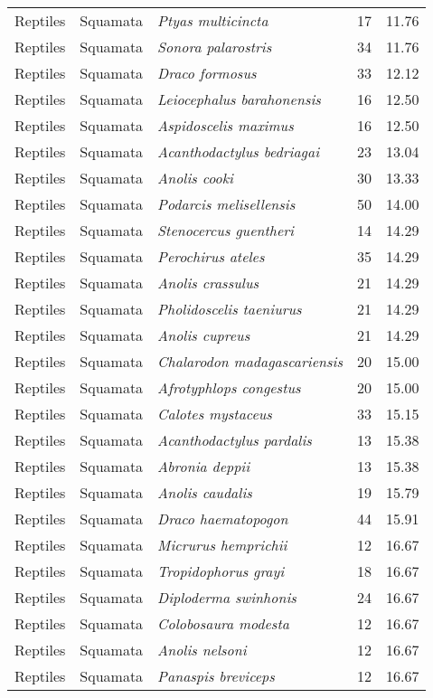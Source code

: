 \begin{longtable}{ll>{\itshape}lcc}
  Reptiles & Squamata & Ptyas multicincta &  17 & 11.76 \\ 
  Reptiles & Squamata & Sonora palarostris &  34 & 11.76 \\ 
  Reptiles & Squamata & Draco formosus &  33 & 12.12 \\ 
  Reptiles & Squamata & Leiocephalus barahonensis &  16 & 12.50 \\ 
  Reptiles & Squamata & Aspidoscelis maximus &  16 & 12.50 \\ 
  Reptiles & Squamata & Acanthodactylus bedriagai &  23 & 13.04 \\ 
  Reptiles & Squamata & Anolis cooki &  30 & 13.33 \\ 
  Reptiles & Squamata & Podarcis melisellensis &  50 & 14.00 \\ 
  Reptiles & Squamata & Stenocercus guentheri &  14 & 14.29 \\ 
  Reptiles & Squamata & Perochirus ateles &  35 & 14.29 \\ 
  Reptiles & Squamata & Anolis crassulus &  21 & 14.29 \\ 
  Reptiles & Squamata & Pholidoscelis taeniurus &  21 & 14.29 \\ 
  Reptiles & Squamata & Anolis cupreus &  21 & 14.29 \\ 
  Reptiles & Squamata & Chalarodon madagascariensis &  20 & 15.00 \\ 
  Reptiles & Squamata & Afrotyphlops congestus &  20 & 15.00 \\ 
  Reptiles & Squamata & Calotes mystaceus &  33 & 15.15 \\ 
  Reptiles & Squamata & Acanthodactylus pardalis &  13 & 15.38 \\ 
  Reptiles & Squamata & Abronia deppii &  13 & 15.38 \\ 
  Reptiles & Squamata & Anolis caudalis &  19 & 15.79 \\ 
  Reptiles & Squamata & Draco haematopogon &  44 & 15.91 \\ 
  Reptiles & Squamata & Micrurus hemprichii &  12 & 16.67 \\ 
  Reptiles & Squamata & Tropidophorus grayi &  18 & 16.67 \\ 
  Reptiles & Squamata & Diploderma swinhonis &  24 & 16.67 \\ 
  Reptiles & Squamata & Colobosaura modesta &  12 & 16.67 \\ 
  Reptiles & Squamata & Anolis nelsoni &  12 & 16.67 \\ 
  Reptiles & Squamata & Panaspis breviceps &  12 & 16.67 \\ 

\end{longtable}
